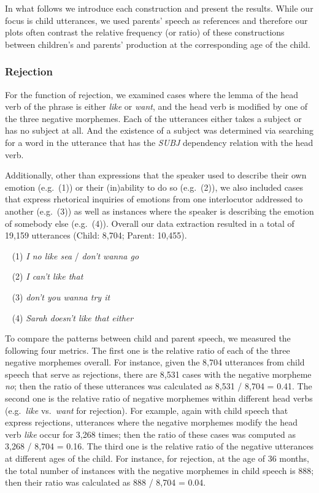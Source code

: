 \documentclass[
  english,
  man,floatsintext]{apa6}
\begin{document}
In what follows we introduce each construction and present the results. While our focus is child utterances, we used parents' speech as references and therefore our plots often contrast the relative frequency (or ratio) of these constructions between children's and parents' production at the corresponding age of the child.

\hypertarget{rejection}{%
\subsubsection{Rejection}\label{rejection}}

For the function of rejection, we examined cases where the lemma of the head verb of the phrase is either \emph{like} or \emph{want}, and the head verb is modified by one of the three negative morphemes. Each of the utterances either takes a subject or has no subject at all. And the existence of a subject was determined via searching for a word in the utterance that has the \emph{SUBJ} dependency relation with the head verb.

Additionally, other than expressions that the speaker used to describe their own emotion (e.g.~(1)) or their (in)ability to do so (e.g.~(2)), we also included cases that express rhetorical inquiries of emotions from one interlocutor addressed to another (e.g.~(3)) as well as instances where the speaker is describing the emotion of somebody else (e.g.~(4)). Overall our data extraction resulted in a total of 19,159 utterances (Child: 8,704; Parent: 10,455).

~
(1) \emph{I no like sea} / \emph{don't wanna go}

~
(2) \emph{I can't like that}

~
(3) \emph{don't you wanna try it}

~
(4) \emph{Sarah doesn't like that either}

To compare the patterns between child and parent speech, we measured the following four metrics. The first one is the relative ratio of each of the three negative morphemes overall. For instance, given the 8,704 utterances from child speech that serve as rejections, there are 8,531 cases with the negative morpheme \emph{no}; then the ratio of these utterances was calculated as 8,531 / 8,704 = 0.41. The second one is the relative ratio of negative morphemes within different head verbs (e.g.~\emph{like} vs.~\emph{want} for rejection). For example, again with child speech that express rejections, utterances where the negative morphemes modify the head verb \emph{like} occur for 3,268 times; then the ratio of these cases was computed as 3,268 / 8,704 = 0.16. The third one is the relative ratio of the negative utterances at different ages of the child. For instance, for rejection, at the age of 36 months, the total number of instances with the negative morphemes in child speech is 888; then their ratio was calculated as 888 / 8,704 = 0.04.
\end{document}
